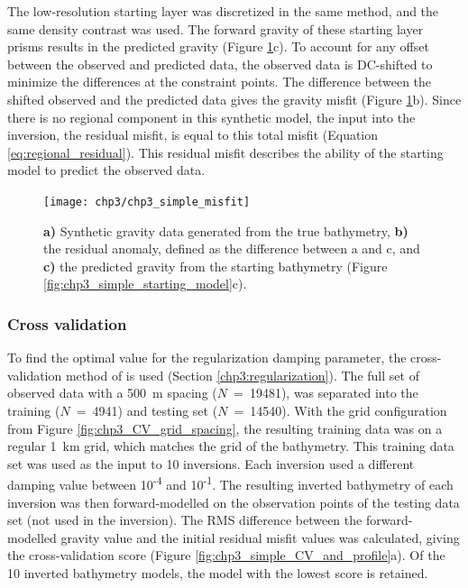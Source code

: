 The low-resolution starting layer was discretized in the same method, and the same density contrast was used. The forward gravity of these starting layer prisms results in the predicted gravity (Figure \ref{fig:chp3_simple_misfit}c). To account for any offset between the observed and predicted data, the observed data is DC-shifted to minimize the differences at the constraint points. The difference between the shifted observed and the predicted data gives the gravity misfit (Figure \ref{fig:chp3_simple_misfit}b). Since there is no regional component in this synthetic model, the input into the inversion, the residual misfit, is equal to this total misfit (Equation \ref{eq:regional_residual}). This residual misfit describes the ability of the starting model to predict the observed data. 

\begin{figure}[!ht]
    \centering
    \texttt{[image: chp3/chp3\_simple\_misfit]}
    \caption[Simple synthetic gravity anomalies]{\textbf{a)} Synthetic gravity data generated from the true bathymetry, \textbf{b)} the residual anomaly, defined as the difference between a and c, and \textbf{c)} the predicted gravity from the starting bathymetry (Figure \ref{fig:chp3_simple_starting_model}c).}
    \label{fig:chp3_simple_misfit}
\end{figure}

\subsubsection{Cross validation} \label{chp3:simple_model_CV}
To find the optimal value for the regularization damping parameter, the cross-validation method of \citet{uiedafast2017} is used (Section \ref{chp3:regularization}). The full set of observed data with a 500~m spacing ($N$~=~19481), was separated into the training ($N$~=~4941) and testing set ($N$~=~14540). With the grid configuration from Figure \ref{fig:chp3_CV_grid_spacing}, the resulting training data was on a regular 1~km grid, which matches the grid of the bathymetry. This training data set was used as the input to 10 inversions. Each inversion used a different damping value between 10\textsuperscript{-4} and 10\textsuperscript{-1}. The resulting inverted bathymetry of each inversion was then forward-modelled on the observation points of the testing data set (not used in the inversion). The RMS difference between the forward-modelled gravity value and the initial residual misfit values was calculated, giving the cross-validation score (Figure \ref{fig:chp3_simple_CV_and_profile}a). Of the 10 inverted bathymetry models, the model with the lowest score is retained.

